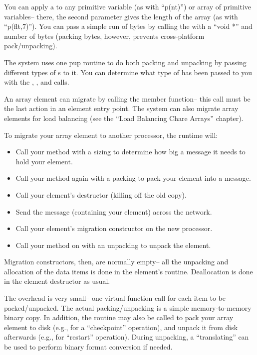 You can apply a  to any primitive variable
(as with ``p(nt)'') or array of primitive variables-- there,
the second parameter gives the length of the array (as with
``p(flt,7)'').  You can pass a simple run of bytes 
by calling the  with a ``void *'' and number of bytes
(packing bytes, however, prevents cross-platform pack/unpacking).

The system uses one pup routine to do both packing and unpacking by
passing different types of s to it.  You can determine
what type of  has been passed to you with the
, , and  calls.

An array element can migrate by calling the  member function-- this call must be the last action
in an element entry point.  The system can also migrate array elements
for load balancing (see the ``Load Balancing Chare Arrays'' chapter).

To migrate your array element to another processor, the \charmpp 
runtime will:

\begin{itemize}
\item Call your  method with a sizing  to determine how 
big a message it needs to hold your element.
\item Call your  method again with a packing  to pack 
your element into a message.
\item Call your element's destructor (killing off the old copy).
\item Send the message (containing your element) across the network.
\item Call your element's migration constructor on the new processor.
\item Call your  method on with an unpacking  to unpack 
the element.
\end{itemize}

Migration constructors, then, are normally empty-- all the unpacking
and allocation of the data items is done in the element's  routine.
Deallocation is done in the element destructor as usual.

The  overhead is very small-- one virtual function call
for each item to be packed/unpacked.  The actual packing/unpacking is
a simple memory-to-memory binary copy.  In addition, the 
routine may also be called to pack your array element to disk (e.g.,
for a ``checkpoint'' operation), and unpack it from disk afterwards
(e.g., for ``restart'' operation).  During unpacking, a
``translating''  can be used to perform binary format
conversion if needed.

